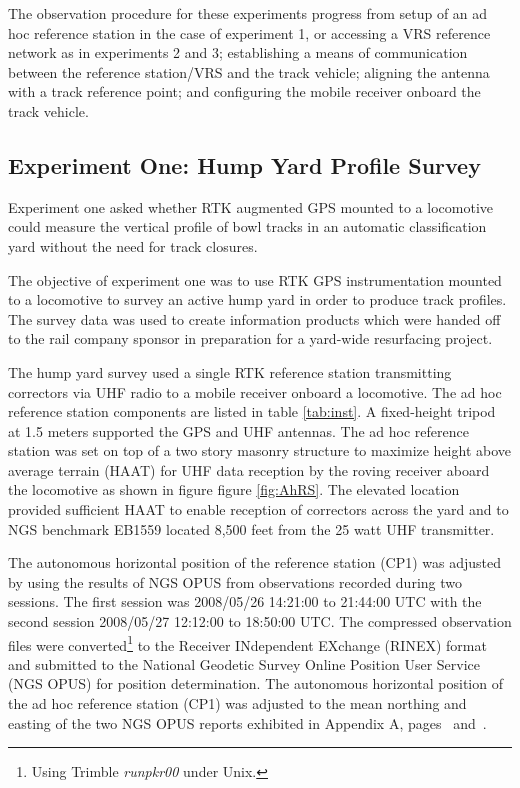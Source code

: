 The observation procedure for these experiments progress from setup of an ad hoc  reference station in the case of experiment 1, or accessing a VRS reference network as in experiments 2 and 3; establishing a means of communication between the reference station/VRS and the track vehicle; aligning the antenna with a track reference point; and configuring the mobile receiver onboard the track vehicle.

\subsection{Experiment One: Hump Yard Profile Survey} \label{ResDHmpYd}

Experiment one asked whether RTK augmented GPS mounted to a locomotive could measure the  vertical profile of bowl tracks in an automatic classification yard without the need for track closures.

The objective of experiment one was to use RTK GPS instrumentation mounted to a locomotive to survey an active hump yard in order to produce track profiles. The survey data was used to create information products which were handed off to the rail company sponsor in preparation for a yard-wide resurfacing project.

The hump yard survey used a single RTK reference station transmitting correctors via UHF radio to a mobile receiver onboard a locomotive.  The ad hoc reference station components are listed in table \ref{tab:inst}. A fixed-height tripod at 1.5 meters supported the GPS and UHF antennas. The ad hoc reference station was set on top of a two story masonry structure to maximize height above average terrain (HAAT) for UHF data reception by the roving receiver aboard the locomotive as shown in figure figure \ref{fig:AhRS}. The elevated location provided sufficient HAAT to enable reception of correctors across the yard and to NGS benchmark EB1559 located 8,500 feet from the 25 watt UHF transmitter.

The autonomous horizontal position of the reference station (CP1) was adjusted by using the results of NGS OPUS from observations recorded during two sessions. The first session was 2008/05/26 14:21:00 to 21:44:00 UTC with the second session 2008/05/27 12:12:00 to 18:50:00 UTC\label{baseRefPeriod}. The compressed observation files were converted\footnote{Using Trimble \emph{runpkr00} under Unix.} to the Receiver INdependent EXchange (RINEX) format and submitted to the National Geodetic Survey Online Position User Service (NGS OPUS) for position determination. The autonomous horizontal position of the ad hoc reference station (CP1) was adjusted to the mean northing and easting of the two NGS OPUS reports exhibited in Appendix A, pages \pageref{opus1}~and~\pageref{opus2}.

